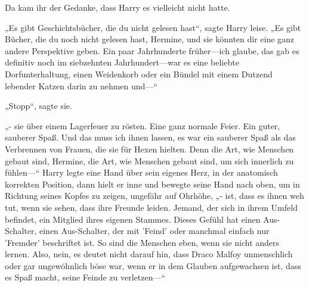 Da kam ihr der Gedanke, dass Harry es vielleicht nicht hatte.

„Es gibt Geschichtsbücher, die du nicht gelesen hast“, sagte Harry leise. „Es gibt Bücher, die du noch nicht gelesen hast, Hermine, und sie könnten dir eine ganz andere Perspektive geben. Ein paar Jahrhunderte früher—ich glaube, das gab es definitiv noch im siebzehnten Jahrhundert—war es eine beliebte Dorfunterhaltung, einen Weidenkorb oder ein Bündel mit einem Dutzend lebender Katzen darin zu nehmen und—“

„Stopp“, sagte sie.

„- sie über einem Lagerfeuer zu rösten. Eine ganz normale Feier. Ein guter, sauberer Spaß. Und das muss ich ihnen lassen, es war ein sauberer Spaß als das Verbrennen von Frauen, die sie für Hexen hielten. Denn die Art, wie Menschen gebaut sind, Hermine, die Art, wie Menschen gebaut sind, um sich innerlich zu fühlen—“ Harry legte eine Hand über sein eigenes Herz, in der anatomisch korrekten Position, dann hielt er inne und bewegte seine Hand nach oben, um in Richtung seines Kopfes zu zeigen, ungefähr auf Ohrhöhe, „- ist, dass es ihnen weh tut, wenn sie sehen, dass ihre Freunde leiden. Jemand, der sich in ihrem Umfeld befindet, ein Mitglied ihres eigenen Stammes. Dieses Gefühl hat einen Aus-Schalter, einen Aus-Schalter, der mit 'Feind' oder manchmal einfach nur 'Fremder' beschriftet ist. So sind die Menschen eben, wenn sie nicht anders lernen. Also, nein, es deutet nicht darauf hin, dass Draco Malfoy unmenschlich oder gar ungewöhnlich böse war, wenn er in dem Glauben aufgewachsen ist, dass es Spaß macht, seine Feinde zu verletzen—“

